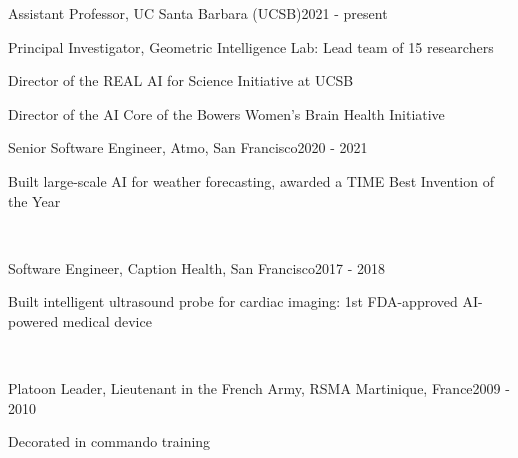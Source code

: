 
\begin{joblong}{Assistant Professor, UC Santa Barbara (UCSB)}{2021 - present}
\item Principal Investigator, Geometric Intelligence Lab: Lead team of 15 researchers
\item Director of the REAL AI for Science Initiative at UCSB
\item Director of the AI Core of the Bowers Women's Brain Health Initiative
\end{joblong}

\begin{joblong}{Senior Software Engineer, Atmo, San Francisco}{2020 - 2021}
\item Built large-scale AI for weather forecasting, awarded a TIME Best Invention of the Year
\end{joblong}~\vspace{-3mm}

\begin{joblong}{Software Engineer, Caption Health, San Francisco}{2017 - 2018}
\item Built  intelligent ultrasound probe for cardiac imaging: 1st FDA-approved AI-powered medical device
\end{joblong}~\vspace{-3mm}

\begin{joblong}{Platoon Leader, Lieutenant in the French Army, RSMA Martinique, France}{2009 - 2010}
\item Decorated in commando training
\end{joblong}~\vspace{-3mm}
